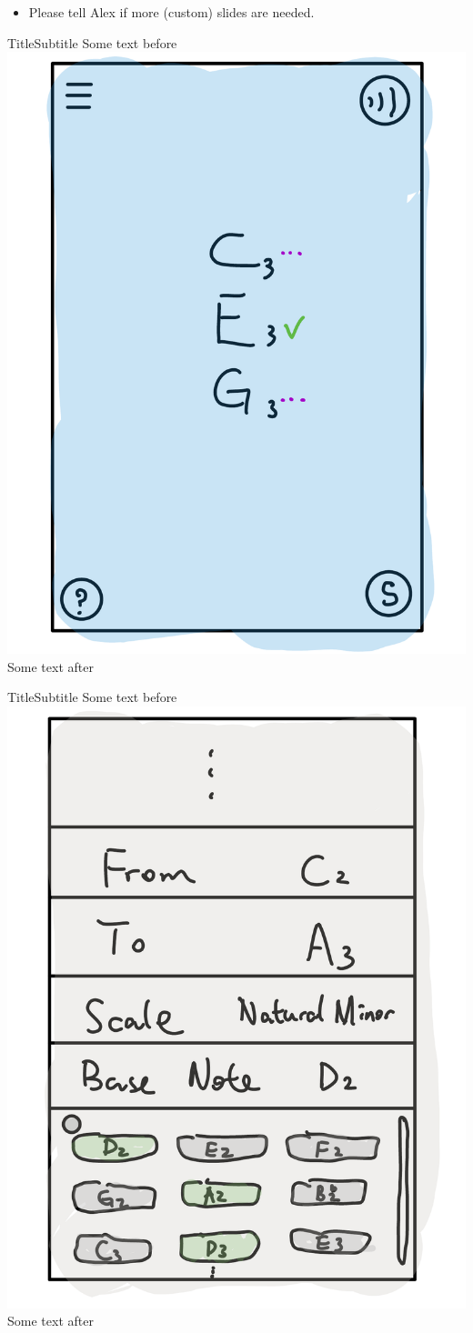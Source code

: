 \documentclass{beamer}
\begin{document}
\begin{frame}
  \begin{itemize}
    \item Please tell Alex if more (custom) slides are needed. 
  \end{itemize}
\end{frame}

\begin{frame}{Title}{Subtitle}
  Some text before
  \includegraphics[page=1,width=.5\textwidth] {./slides_separate/chord-practice-C3-E3-G3.pdf}
  Some text after
\end{frame}
\begin{frame}{Title}{Subtitle}
  Some text before
  \includegraphics[page=1,width=.5\textwidth] {./slides_separate/custom-setting.pdf}
  Some text after
\end{frame}
\end{document}
